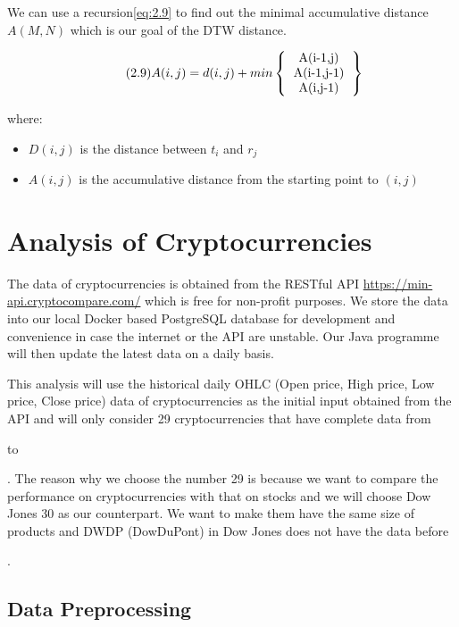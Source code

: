 \documentclass[11pt]{article} %
\theoremstyle{plain}
\theoremstyle{definition}
\begin{document}
We can use a recursion\eqref{eq:2.9} to find out the minimal accumulative distance $A(M,N)$ which is our goal of the DTW distance\cite{wiki/dtw:2018}.

{
    \begin{equation}
        \label{eq:2.9}
        \tag{2.9}
        {A(i,j) = d(i,j) + min
        \left \{
            \begin{tabular}{c}
                A(i-1,j) \\
                A(i-1,j-1) \\
                A(i,j-1)
            \end{tabular}
        \right \}}
    \end{equation}

    \footnotesize
    where:
    \begin{itemize}[label=-, leftmargin=4em, itemsep=0.1em]
        \item $D(i,j)$ is the distance between $t_i$ and $r_j$
        \item $A(i,j)$ is the accumulative distance from the starting point to $(i,j)$
    \end{itemize}
}

\section{Analysis of Cryptocurrencies}

The data of cryptocurrencies is obtained from the RESTful API \url{https://min-api.cryptocompare.com/}\cite{cryptocompare} which is free for non-profit purposes. We store the data into our local Docker based PostgreSQL database for development and convenience in case the internet or the API are unstable. Our Java programme will then update the latest data on a daily basis.

This analysis will use the historical daily OHLC (Open price, High price, Low price, Close price) data of cryptocurrencies as the initial input obtained from the API and will only consider 29 cryptocurrencies that have complete data from \date{1st January 2016} to \date{31st July 2018}. The reason why we choose the number 29 is because we want to compare the performance on cryptocurrencies with that on stocks and we will choose Dow Jones 30 as our counterpart. We want to make them have the same size of products and DWDP (DowDuPont) in Dow Jones does not have the data before \date{1st September 2017}.

\subsection{Data Preprocessing}
\end{document}
